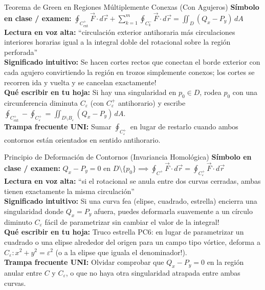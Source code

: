 \documentclass[11pt,a4paper]{article}
\begin{document}
\begin{definicionbox}{Teorema de Green en Regiones Múltiplemente Conexas (Con Agujeros)}
\textbf{Símbolo en clase / examen:} $\oint_{C_{\text{ext}}^+} \vec{F}\cdot d\vec{r} + \sum_{k=1}^m \oint_{C_k^-} \vec{F}\cdot d\vec{r} = \iint_D (Q_x - P_y)\,dA$\\[0.15cm]
\textbf{Lectura en voz alta:} ``circulación exterior antihoraria más circulaciones interiores horarias igual a la integral doble del rotacional sobre la región perforada''\\[0.12cm]
\textbf{Significado intuitivo:} Se hacen cortes rectos que conectan el borde exterior con cada agujero convirtiendo la región en trozos simplemente conexos; los cortes se recorren ida y vuelta y se cancelan exactamente!\\[0.12cm]
\textbf{Qué escribir en tu hoja:} Si hay una singularidad en $p_0 \in D$, rodea $p_0$ con una circunferencia diminuta $C_\varepsilon$ (con $C_\varepsilon^+$ antihorario) y escribe $\oint_{C_{\text{ext}}^+} - \oint_{C_\varepsilon^+} = \iint_{D\setminus B_\varepsilon} (Q_x - P_y)\,dA$.\\[0.12cm]
\textbf{Trampa frecuente UNI:} Sumar $\oint_{C_\varepsilon^+}$ en lugar de restarlo cuando ambos contornos están orientados en sentido antihorario.
\end{definicionbox}

\begin{definicionbox}{Principio de Deformación de Contornos (Invariancia Homológica)}
\textbf{Símbolo en clase / examen:} $Q_x - P_y = 0 \text{ en } D \setminus \{p_0\} \implies \oint_{C^+} \vec{F}\cdot d\vec{r} = \oint_{C_\varepsilon^+} \vec{F}\cdot d\vec{r}$\\[0.15cm]
\textbf{Lectura en voz alta:} ``si el rotacional se anula entre dos curvas cerradas, ambas tienen exactamente la misma circulación''\\[0.12cm]
\textbf{Significado intuitivo:} Si una curva fea (elipse, cuadrado, estrella) encierra una singularidad donde $Q_x = P_y$ afuera, puedes deformarla suavemente a un círculo diminuto $C_\varepsilon$ fácil de parametrizar sin cambiar el valor de la integral!\\[0.12cm]
\textbf{Qué escribir en tu hoja:} Truco estrella PC6: en lugar de parametrizar un cuadrado o una elipse alrededor del origen para un campo tipo vórtice, deforma a $C_\varepsilon : x^2+y^2=\varepsilon^2$ (o a la elipse que iguala el denominador!).\\[0.12cm]
\textbf{Trampa frecuente UNI:} Olvidar comprobar que $Q_x - P_y = 0$ en la región anular entre $C$ y $C_\varepsilon$, o que no haya otra singularidad atrapada entre ambas curvas.
\end{definicionbox}
\end{document}
